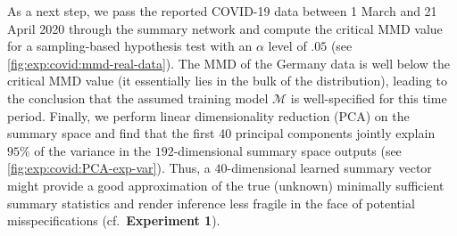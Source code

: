 \documentclass[twoside,11pt]{article}
\newcommand{\numberGaussianMeans}{1}
\newcommand{\0}{\boldsymbol{0}}
\newcommand{\M}{\mathcal{M}}
\begin{document}
As a next step, we pass the reported COVID-19 data between 1 March and 21 April 2020 \citep[data from][under CC BY 4.0 license]{dong_interactive_2020} through the summary network and compute the critical MMD value for a sampling-based hypothesis test with an $\alpha$ level of $.05$ (see \autoref{fig:exp:covid:mmd-real-data}). 
The MMD of the Germany data is well below the critical MMD value (it essentially lies in the bulk of the distribution), leading to the conclusion that the assumed training model $\M$ is well-specified for this time period.
Finally, we perform linear dimensionality reduction (PCA) on the summary space and find that the first 40 principal components jointly explain $95\%$ of the variance in the $192$-dimensional summary space outputs (see \autoref{fig:exp:covid:PCA-exp-var}). 
Thus, a $40$-dimensional learned summary vector might provide a good approximation of the true (unknown) minimally sufficient summary statistics and render inference less fragile in the face of potential misspecifications (cf.\ \textbf{Experiment \numberGaussianMeans}).
\end{document}

